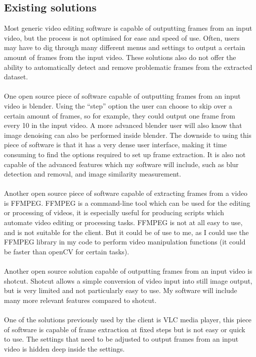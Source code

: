 \documentclass[11pt]{report}
\begin{document}
\subsection{Existing solutions}
Most generic video editing software is capable of outputting frames from an input video, but the process is not optimised for ease and speed of use. Often, users may have to dig through many different menus and settings to output a certain amount of frames from the input video.
These solutions also do not offer the ability to automatically detect and remove problematic frames from the extracted dataset.\\\\
One open source piece of software capable of outputting frames from an input video is blender. Using the ``step'' option the user can choose to skip over a certain amount of frames, so for example, they could output one frame from every 10 in the input video. A more advanced blender user will also know that image denoising can also be performed inside blender.
The downside to using this piece of software is that it has a very dense user interface, making it time consuming to find the options required to set up frame extraction.
It is also not capable of the advanced features which my software will include, such as blur detection and removal, and image similarity measurement.\\\\
Another open source piece of software capable of extracting frames from a video is FFMPEG. FFMPEG is a command-line tool which can be used for the editing or processing of videos, it is especially useful for producing scripts which automate video editing or processing tasks. FFMPEG is not at all easy to use, and is not suitable for the client. But it could be of use to me, as I could use the FFMPEG library in my code to perform video manipulation functions (it could be faster than openCV for certain tasks).\\\\
Another open source solution capable of outputting frames from an input video is shotcut. Shotcut allows a simple conversion of video input into still image output, but is very limited and not particularly easy to use. My software will include many more relevant features compared to shotcut.\\\\
One of the solutions previously used by the client is VLC media player, this piece of software is capable of frame extraction at fixed steps but is not easy or quick to use. The settings that need to be adjusted to output frames from an input video is hidden deep inside the settings.\\\\
\end{document}
